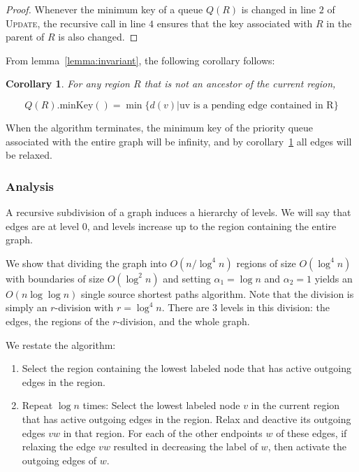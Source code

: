 \documentclass[12pt]{article}
\newtheorem{corollary}{Corollary}[theorem]
\begin{document}
\begin{proof}
  Whenever the minimum key of a queue $Q(R)$ is changed in line $2$ of \textsc{Update}, the recursive call in line $4$ ensures that the key associated with $R$ in the parent of $R$ is also changed.
\end{proof}

From lemma~\ref{lemma:invariant}, the following corollary follows:\\

\begin{corollary}
\label{cor:relaxed}
  For any region $R$ that is not an ancestor of the current region,

  \[
    Q(R).\text{minKey}() = \min \{ d(v) | \text{uv is a pending edge contained in R} \}
  \]
\end{corollary}

When the algorithm terminates, the minimum key of the priority queue associated with the entire graph will be infinity, and by corollary~\ref{cor:relaxed} all edges will be relaxed.

\subsubsection{Analysis}
\label{sec:analysis}

A recursive subdivision of a graph induces a hierarchy of levels. We will say that edges are at level $0$, and levels increase up to the region containing the entire graph.

We show that dividing the graph into $O(n/\log^4n)$ regions of size $O(\log^4 n)$ with boundaries of size $O(\log^2 n)$ and setting $\alpha_1 = \log n$ and $\alpha_2 = 1$ yields an $O(n \log \log n)$ single source shortest paths algorithm. Note that the division is simply an $r$-division with $r=\log^4 n$. There are $3$ levels in this division: the edges, the regions of the $r$-division, and the whole graph.

We restate the algorithm:
\begin{enumerate}
\item Select the region containing the lowest labeled node that has active outgoing edges in the region.
\item Repeat $\log n$ times: Select the lowest labeled node $v$ in the current region that has active outgoing edges in the region. Relax and deactive its outgoing edges $vw$ in that region. For each of the other endpoints $w$ of these edges, if relaxing the edge $vw$ resulted in decreasing the label of $w$, then activate the outgoing edges of $w$.
\end{enumerate}
\end{document}
